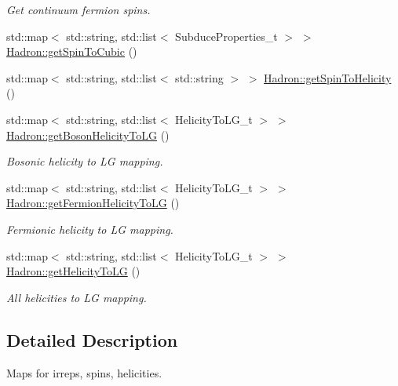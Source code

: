 \begin{DoxyCompactItemize}
\begin{DoxyCompactList}\small\item\em Get continuum fermion spins. \end{DoxyCompactList}\item 
std\+::map$<$ std\+::string, std\+::list$<$ Subduce\+Properties\+\_\+t $>$ $>$ \mbox{\hyperlink{namespaceHadron_a0ad570b7ce2fbc8f215d0a5ee08afdb2}{Hadron\+::get\+Spin\+To\+Cubic}} ()
\item 
std\+::map$<$ std\+::string, std\+::list$<$ std\+::string $>$ $>$ \mbox{\hyperlink{namespaceHadron_a65015bc93f8b83c79f094361b407ed28}{Hadron\+::get\+Spin\+To\+Helicity}} ()
\item 
std\+::map$<$ std\+::string, std\+::list$<$ Helicity\+To\+L\+G\+\_\+t $>$ $>$ \mbox{\hyperlink{namespaceHadron_a82bbcfd69a36dd0f63d6181069ff7393}{Hadron\+::get\+Boson\+Helicity\+To\+LG}} ()
\begin{DoxyCompactList}\small\item\em Bosonic helicity to LG mapping. \end{DoxyCompactList}\item 
std\+::map$<$ std\+::string, std\+::list$<$ Helicity\+To\+L\+G\+\_\+t $>$ $>$ \mbox{\hyperlink{namespaceHadron_af7b75d50b2ca47d90a4d42ff7152bf4d}{Hadron\+::get\+Fermion\+Helicity\+To\+LG}} ()
\begin{DoxyCompactList}\small\item\em Fermionic helicity to LG mapping. \end{DoxyCompactList}\item 
std\+::map$<$ std\+::string, std\+::list$<$ Helicity\+To\+L\+G\+\_\+t $>$ $>$ \mbox{\hyperlink{namespaceHadron_aeab17d669da3fa4a904236091bd5384f}{Hadron\+::get\+Helicity\+To\+LG}} ()
\begin{DoxyCompactList}\small\item\em All helicities to LG mapping. \end{DoxyCompactList}\end{DoxyCompactItemize}


\subsection{Detailed Description}
Maps for irreps, spins, helicities. 

